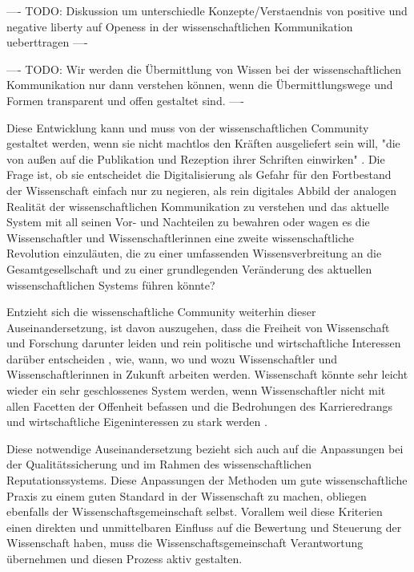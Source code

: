 ---- TODO: Diskussion um unterschiedle Konzepte/Verstaendnis von positive und negative liberty \cite{kelty_2014_freedom} auf Openess in der wissenschaftlichen Kommunikation ueberttragen ----

---- TODO: Wir werden die Übermittlung von Wissen bei der wissenschaftlichen Kommunikation nur dann verstehen können, wenn die Übermittlungswege und Formen transparent und offen gestaltet sind. \cite{davis_2011_open} ----

Diese Entwicklung kann und muss von der wissenschaftlichen Community gestaltet werden, wenn sie nicht machtlos den Kräften ausgeliefert sein will, "die von außen auf die Publikation und Rezeption ihrer Schriften einwirken" \cite{Hirschi_2015_buch_oa}. Die Frage ist, ob sie entscheidet die Digitalisierung als Gefahr für den Fortbestand der Wissenschaft einfach nur zu negieren, als rein digitales Abbild der analogen Realität der wissenschaftlichen Kommunikation zu verstehen und das aktuelle System mit all seinen Vor- und Nachteilen zu bewahren oder wagen es die Wissenschaftler und Wissenschaftlerinnen eine zweite wissenschaftliche Revolution einzuläuten, die zu einer umfassenden Wissensverbreitung an die Gesamtgesellschaft und zu einer grundlegenden Veränderung des aktuellen wissenschaftlichen Systems führen könnte?

Entzieht sich die wissenschaftliche Community weiterhin dieser Auseinandersetzung, ist davon auszugehen, dass die Freiheit von Wissenschaft und Forschung darunter leiden und rein politische und wirtschaftliche Interessen darüber entscheiden \cite{Warnke_2012}, wie, wann, wo und wozu Wissenschaftler und Wissenschaftlerinnen in Zukunft arbeiten werden. Wissenschaft könnte sehr leicht wieder ein sehr geschlossenes System werden, wenn Wissenschaftler nicht mit allen Facetten der Offenheit befassen und die Bedrohungen des Karrieredrangs und wirtschaftliche Eigeninteressen zu stark werden \cite{resnik_2005_ethics}.

Diese notwendige Auseinandersetzung bezieht sich auch auf die Anpassungen bei der Qualitätssicherung und im Rahmen des wissenschaftlichen Reputationssystems. Diese Anpassungen der Methoden um gute wissenschaftliche Praxis zu einem guten Standard in der Wissenschaft zu machen, obliegen ebenfalls der Wissenschaftsgemeinschaft selbst. Vorallem weil diese Kriterien einen direkten und unmittelbaren Einfluss auf die Bewertung und Steuerung der Wissenschaft haben, muss die Wissenschaftsgemeinschaft Verantwortung übernehmen und diesen Prozess aktiv gestalten.

